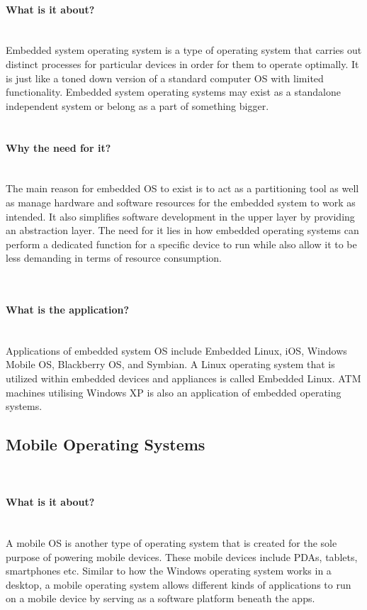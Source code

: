 \documentclass[conference]{IEEEtran}
\newcommand{\forceindent}{\leavevmode{\parindent=1em\indent}}
\begin{document}
\paragraph{What is it about?}\mbox{} \\
\forceindent Embedded system operating system is a type of operating system that carries out distinct processes for particular devices in order for them to operate optimally. It is just like a toned down version of a standard computer OS with limited functionality\cite{TNEOS}. Embedded system operating systems may exist as a standalone independent system or belong as a part of something bigger\cite{ITEOSMC}. \\

\\
\paragraph{Why the need for it?}\mbox{} \\
\forceindent The main reason for embedded OS to exist is to act as a partitioning tool as well as manage hardware and software resources for the embedded system to work as intended. It also simplifies software development in the upper layer by providing an abstraction layer. The need for it lies in how embedded operating systems can perform a dedicated function for a specific device to run while also allow it to be less demanding in terms of resource consumption\cite{ITEOSPV}.

\\
\bigskip
\paragraph{What is the application?}\mbox{} \\
\forceindent Applications of embedded system OS include Embedded Linux, iOS, Windows Mobile OS, Blackberry OS, and Symbian. A Linux operating system that is utilized within embedded devices and appliances is called Embedded Linux. ATM machines utilising Windows XP is also an application of embedded operating systems.

\subsection{Mobile Operating Systems}\\
\paragraph{What is it about?}\mbox{} \\
\forceindent A mobile OS is another type of operating system that is created for the sole purpose of powering mobile devices. These mobile devices include PDAs, tablets, smartphones etc. Similar to how the Windows operating system works in a desktop, a mobile operating system allows different kinds of applications to run on a mobile device by serving as a software platform beneath the apps.
\\
\end{document}

